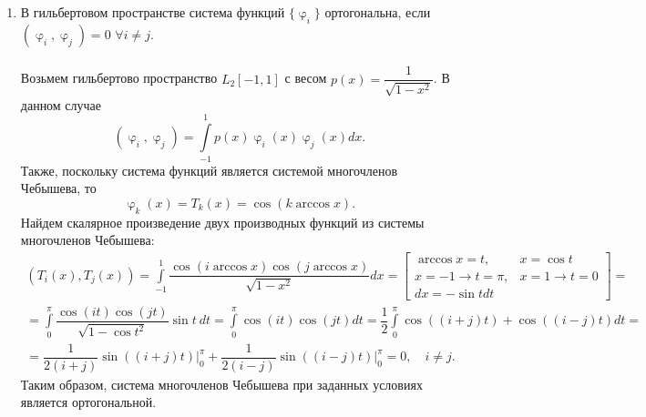 \documentclass[a4paper, 12pt]{article}
\renewcommand{\varphi}{\upvarphi}
\begin{document}
\begin{enumerate}
	\newpage
	\item 
	\hypertarget{t10}{}
	В гильбертовом пространстве система функций $\{\varphi_i\}$ ортогональна, если $(\varphi_i, \varphi_j) =0$ $\forall i\ne j$. \\\\
	Возьмем гильбертово пространство $L_2[-1,1]$ с весом $p(x) = \dfrac{1}{\sqrt{1-x^2}}$. В данном случае $$(\varphi_i, \varphi_j) = \int\limits_{-1}^1 p(x)\varphi_i(x)\varphi_j(x) dx.$$
	Также, поскольку система функций является системой многочленов Чебышева, то $$\varphi_k(x) = T_k(x) = \cos (k\arccos x).$$
	Найдем скалярное произведение двух производных функций из системы многочленов Чебышева:
	\begin{multline*}
		(T_i(x), T_j(x)) = \int\limits_{-1}^1 \dfrac{\cos (i\arccos x)\cos(j \arccos x)}{\sqrt{1-x^2}} dx = \left[\begin{matrix}
			\arccos x = t, & x = \cos t\\
			x=-1 \to t=\pi, & x=1 \to t = 0\\
			dx = -\sin t dt
		\end{matrix}\right] =\\ = \int\limits_{0}^\pi \dfrac{\cos (it)\cos(j t)}{\sqrt{1-\cos t^2}}\sin t\ dt = \int\limits_{0}^\pi \cos (it)\cos(j t) dt = \dfrac12\int\limits_{0}^\pi \cos ((i+j)t)+\cos((i-j) t) dt=\\= \dfrac{1}{2(i+j)}\sin ((i+j)t)\Big|_0^\pi + \dfrac{1}{2(i-j)}\sin ((i-j)t)\Big|_0^\pi = 0,\quad i \ne j.
	\end{multline*}
	Таким образом, система многочленов Чебышева при заданных условиях является ортогональной.
	

\end{enumerate}
\end{document}
